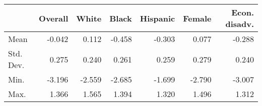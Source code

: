 
\begin{tabular}{lrrrrrr}
\toprule
  & Overall & White & Black & Hispanic & Female & Econ. disadv.\\
\midrule
Mean & -0.042 & 0.112 & -0.458 & -0.303 & 0.077 & -0.288\\
Std. Dev. & 0.275 & 0.240 & 0.261 & 0.259 & 0.279 & 0.240\\
Min. & -3.196 & -2.559 & -2.685 & -1.699 & -2.790 & -3.007\\
Max. & 1.366 & 1.565 & 1.394 & 1.320 & 1.496 & 1.312\\
\bottomrule
\end{tabular}
